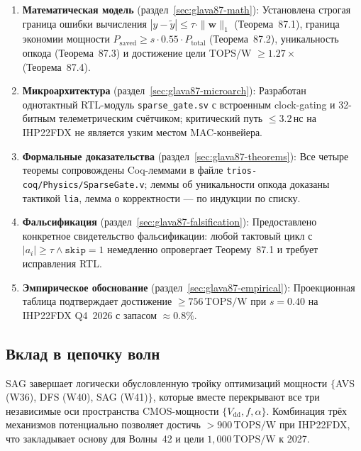 \begin{enumerate}
  \item \textbf{Математическая модель} (раздел~\ref{sec:glava87-math}):
        Установлена строгая граница ошибки вычисления
        $|y - \tilde{y}| \leq \tau \cdot \|\mathbf{w}\|_1$
        (Теорема~87.1), граница экономии мощности
        $P_{\mathrm{saved}} \geq s \cdot 0{.}55 \cdot P_{\mathrm{total}}$
        (Теорема~87.2), уникальность опкода (Теорема~87.3)
        и достижение цели TOPS/W $\geq 1{.}27\times$ (Теорема~87.4).

  \item \textbf{Микроархитектура} (раздел~\ref{sec:glava87-microarch}):
        Разработан однотактный RTL-модуль \texttt{sparse\_gate.sv}
        с встроенным clock-gating и 32-битным телеметрическим счётчиком;
        критический путь $\leq 3{.}2\,\text{нс}$ на IHP22FDX не является
        узким местом MAC-конвейера.

  \item \textbf{Формальные доказательства} (раздел~\ref{sec:glava87-theorems}):
        Все четыре теоремы сопровождены Coq-леммами в файле
        \texttt{trios-coq/Physics/SparseGate.v};
        леммы об уникальности опкода доказаны тактикой \texttt{lia},
        лемма о корректности — по индукции по списку.

  \item \textbf{Фальсификация} (раздел~\ref{sec:glava87-falsification}):
        Предоставлено конкретное свидетельство фальсификации:
        любой тактовый цикл с $|a_i| \geq \tau \wedge \texttt{skip} = 1$
        немедленно опровергает Теорему~87.1 и требует исправления RTL.

  \item \textbf{Эмпирическое обоснование} (раздел~\ref{sec:glava87-empirical}):
        Проекционная таблица подтверждает достижение
        $\geq 756\,\text{TOPS/W}$ при $s = 0{.}40$ на IHP22FDX Q4~2026
        с запасом $\approx 0{.}8\%$.
\end{enumerate}

\subsection{Вклад в цепочку волн}
\label{ssec:glava87-contribution}

SAG завершает логически обусловленную тройку оптимизаций мощности
$\{$AVS (W36), DFS (W40), SAG (W41)$\}$, которые вместе перекрывают
все три независимые оси пространства CMOS-мощности $\{V_{\mathrm{dd}},
f, \alpha\}$.  Комбинация трёх механизмов потенциально позволяет
достичь $> 900\,\text{TOPS/W}$ при IHP22FDX, что закладывает
основу для Волны~42 и цели $1{,}000\,\text{TOPS/W}$ к 2027.

